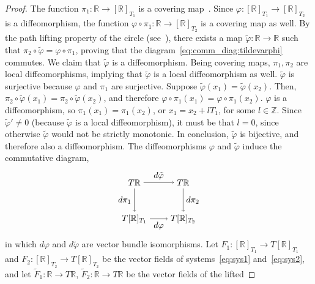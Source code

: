 \begin{proof}
	The function $\pi_1 : \mathbb{R} \to [\mathbb{R}]_{T_1}$ is a covering
	map~\cite{Lee13}. Since $\varphi: [\mathbb{R}]_{T_1} \to [\mathbb{R}]_{T_2}$ is a
	diffeomorphism, the function $\varphi \circ \pi_1 : \mathbb{R} \to [\mathbb{R}]_{T_2}$ is
	a covering map as well. By the path lifting property of the circle
	(see~\cite[Corollary~8.5]{Lee13}), there exists a map $\tilde \varphi
	: \mathbb{R} \to \mathbb{R}$ such that $\pi_2 \circ \tilde \varphi = \varphi \circ
	\pi_1$, proving that the diagram~\eqref{eq:comm_diag:tildevarphi}
	commutes. We claim that $\tilde \varphi$ is a diffeomorphism. Being
	covering maps, $\pi_1, \pi_2$ are local diffeomorphisms, implying that
	$\tilde \varphi$ is a local diffeomorphism as well. $\tilde \varphi$
	is surjective because $\varphi$ and $\pi_1$ are surjective. Suppose
	$\tilde \varphi(x_1) = \tilde \varphi(x_2)$. Then, $\pi_2 \circ \tilde
	\varphi(x_1) = \pi_2 \circ \tilde \varphi(x_2)$, and therefore $\varphi \circ
	\pi_1(x_1) = \varphi \circ \pi_1(x_2)$.  $\varphi$ is a
	diffeomorphism, so $\pi_1(x_1) = \pi_1(x_2)$, or $x_1 = x_2 + l T_1$,
	for some $l \in \mathbb{Z}$.  Since $\tilde \varphi' \neq 0$ (because $\tilde
	\varphi$ is a local diffeomorphism), it must be that $l=0$, since
	otherwise $\tilde \varphi$ would not be strictly monotonic.  In
	conclusion, $\tilde \varphi$ is bijective, and therefore also a
	diffeomorphism.  The diffeomorphisms $\varphi$ and $\tilde \varphi$
	induce the commutative diagram,
				\begin{equation}\label{eq:comm_diag:tildedvarphi}
	\begin{tikzpicture}[node distance=1.5cm, auto,baseline=(current  bounding  box.center)]
	\node (R1) {$T\mathbb{R}$};
	\node (R2) [node distance=2cm,right of=R1] {$T\mathbb{R}$};
	\node (R1T1) [below of=R1] {$T[\mathbb{R}]_{T_1}$};
	\node (R2T2) [below of=R2] {$T[\mathbb{R}]_{T_2}$};
	\draw[->] (R1) to node {$d \tilde \varphi$} (R2);
	\draw[->] (R1T1) to node [swap] {$d \varphi$} (R2T2);
	\draw[->] (R1) to node [swap] {$d\pi_1$} (R1T1);
	\draw[->] (R2) to node {$d\pi_2$} (R2T2);
	\end{tikzpicture}
	\end{equation}
				in which $d \varphi$ and $d \tilde \varphi$ are vector bundle
	isomorphisms. Let $F_1: [\mathbb{R}]_{T_1} \to T [\mathbb{R}]_{T_1}$ and $F_2: [\mathbb{R}]_{T_2} \to T
	[\mathbb{R}]_{T_2}$ be the vector fields of systems~\eqref{eq:sys1}
	and~\eqref{eq:sys2}, and let $\tilde F_1 : \mathbb{R} \to T \mathbb{R}$, $\tilde F_2
	: \mathbb{R} \to T \mathbb{R}$ be the vector fields of the lifted

\end{proof}
